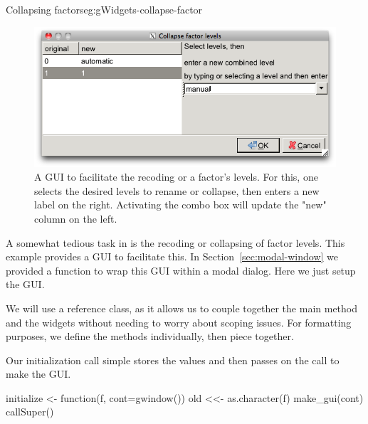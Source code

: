 \begin{example}{Collapsing factors}{eg:gWidgets-collapse-factor}
 
  \begin{figure}
    \centering
    \includegraphics[width=.8\textwidth]{fig-gWidgets-collapse-factor.png}
    \caption{A GUI to facilitate the recoding or a factor's levels. For this, one selects the desired levels to rename or collapse, then enters a new label on the right. Activating the combo box will update the "new" column on the left.}
    \label{fig:gWidgets-collapse-factor}
  \end{figure}
  
  
  
  A somewhat tedious task in \R{} is the recoding or collapsing of
  factor levels. This example provides a GUI to facilitate this. In
  Section~\ref{sec:modal-window} we provided a function to wrap this
  GUI within a modal dialog. Here we just setup the GUI. 
  
  We will use a reference class, as it allows us to couple together
  the main method and the widgets without needing to worry about
  scoping issues. For formatting purposes, we define the methods
  individually, then piece together.
  
  Our initialization call simple stores the values and then passes on
  the call to make the GUI.
\begin{Schunk}
\begin{Sinput}
 initialize <- function(f, cont=gwindow()) {
   old <<- as.character(f)
   make_gui(cont)
   callSuper()
 }
\end{Sinput}
\end{Schunk}


\end{example}
